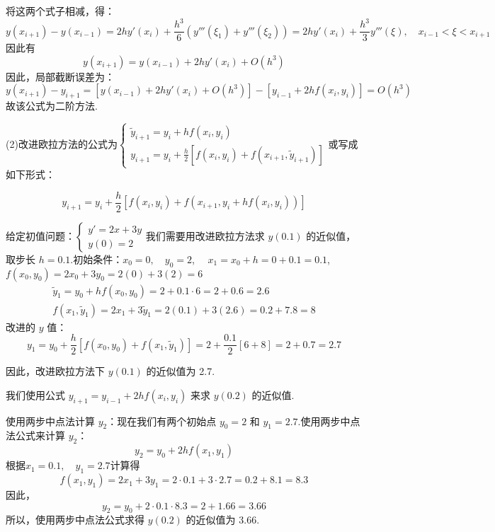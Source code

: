 \begin{tcolorbox}
将这两个式子相减，得：
$$
y(x_{i+1}) - y(x_{i-1}) = 2h y'(x_i) + \frac{h^3}{6} \left( y'''(\xi_1) + y'''(\xi_2) \right)=2h y'(x_i) + \frac{h^3}{3} y'''(\xi),\quad x_{i-1} < \xi < x_{i+1}
$$
因此有
$$
y(x_{i+1}) = y(x_{i-1}) + 2h y'(x_i) + O(h^3)
$$
因此，局部截断误差为：
$$y(x_{i+1})-y_{i+1}=[ y(x_{i-1}) + 2h y'(x_i) + O(h^3)]-[ y_{i-1} + 2hf(x_i, y_i)]=O(h^3)$$
故该公式为二阶方法.

(2)改进欧拉方法的公式为$\left\{\begin{array}{l}
    \widetilde{y}_{i+1}= y_i + h f(x_i, y_i)  \\
    y_{i+1} = y_i + \frac{h}{2} \left[ f(x_i, y_i) + f\left(x_{i + 1}, \widetilde{y}_{i+1} \right) \right]
\end{array}\right.$或写成如下形式：


$$y_{i+1} = y_i + \frac{h}{2} \left[ f(x_i, y_i) + f\left(x_{i + 1}, y_i + h f(x_i, y_i) \right) \right]
$$

给定初值问题：$\left\{
\begin{array}{l}
y' = 2x + 3y \\
y(0) = 2
\end{array}
\right.$我们需要用改进欧拉方法求  $y(0.1)$ 的近似值，取步长 $h = 0.1$.初始条件：$x_0 = 0, \quad y_0 = 2$, $\quad x_1 = x_0 + h = 0 + 0.1 = 0.1$, $f(x_0, y_0) = 2x_0 + 3y_0 = 2(0) + 3(2) = 6$
$$
\begin{array}{c}
      \widetilde{y}_{1} = y_0 + h f(x_0, y_0) = 2 + 0.1 \cdot 6 = 2 + 0.6 = 2.6 \\
     f(x_1, \widetilde{y}_{1}) = 2x_1 + 3\widetilde{y}_{1} = 2(0.1) + 3(2.6) = 0.2 + 7.8 = 8
\end{array}
$$
改进的 $y$ 值：
$$
   y_1 = y_0 + \frac{h}{2} \left[ f(x_0, y_0) + f(x_1, \widetilde{y}_{1}) \right] = 2 + \frac{0.1}{2} \left[ 6 + 8 \right] = 2 + 0.7 = 2.7
$$

因此，改进欧拉方法下 $ y(0.1) $ 的近似值为 2.7.

我们使用公式 $ y_{i+1} = y_{i-1} + 2hf(x_i, y_i) $ 来求 $ y(0.2) $ 的近似值.





使用两步中点法计算 $ y_2 $：现在我们有两个初始点 $ y_0 = 2 $ 和 $ y_1 = 2.7 $.使用两步中点法公式来计算 $ y_2 $：
$$
y_2 = y_0 + 2hf(x_1, y_1)
$$
根据$x_1 = 0.1, \quad y_1 = 2.7$计算得
$$
f(x_1, y_1) = 2x_1 + 3y_1 = 2 \cdot 0.1 + 3 \cdot 2.7 = 0.2 +8.1 = 8.3
$$
因此，
$$
y_2 = y_0 + 2 \cdot 0.1 \cdot 8.3 = 2 + 1.66 = 3.66
$$
所以，使用两步中点法公式求得 $ y(0.2) $ 的近似值为 3.66.


\end{tcolorbox}

